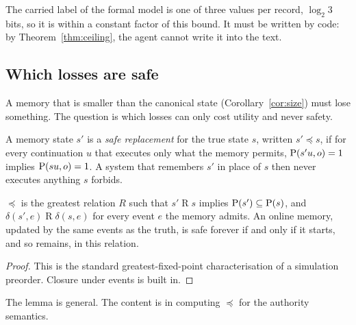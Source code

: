 The carried label of the formal model is one of three values per record, $\log_2 3$ bits, so it is
within a constant factor of this bound. It must be written by code: by
Theorem~\ref{thm:ceiling}, the agent cannot write it into the text.

\subsection*{Which losses are safe}

A memory that is smaller than the canonical state (Corollary~\ref{cor:size}) must lose something.
The question is which losses can only cost utility and never safety.

\begin{definition}
A memory state $s'$ is a \emph{safe replacement} for the true state $s$, written $s' \preceq s$, if
for every continuation $u$ that executes only what the memory permits,
$\mathrm{P}(s' u, o) = 1$ implies $\mathrm{P}(s u, o) = 1$. A system that remembers $s'$ in place of $s$ then
never executes anything $s$ forbids.
\end{definition}

\begin{lemma}\label{lem:simulation}
$\preceq$ is the greatest relation $R$ such that $s' \mathrel{R} s$ implies
$\mathrm{P}(s') \subseteq \mathrm{P}(s)$, and $\delta(s', e) \mathrel{R} \delta(s, e)$ for every event $e$ the
memory admits. An online memory, updated by the same events as the truth, is safe forever if and
only if it starts, and so remains, in this relation.
\end{lemma}
\begin{proof}
This is the standard greatest-fixed-point characterisation of a simulation preorder. Closure under
events is built in.
\end{proof}

The lemma is general. The content is in computing $\preceq$ for the authority semantics.

